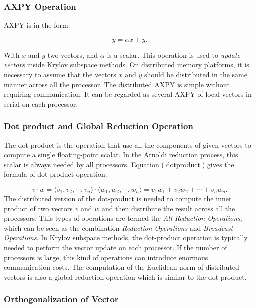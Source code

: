 {\subsubsection{AXPY Operation}

AXPY is in the form:

\begin{equation}
y = \alpha x + y.
\end{equation}

With $x$ and $y$ two vectors, and $\alpha$ is a scalar. This operation is used to \textit{update vectors} inside Krylov subspace methods. On distributed memory platforms, it is necessary to assume that the vectors $x$ and $y$ should be distributed in the same manner across all the processor. The distributed AXPY is simple without requiring communication. It can be regarded as several AXPY of local vectors in serial on each processor.

\subsubsection{Dot product and Global Reduction Operation}

The dot product is the operation that use all the components of given vectors to compute a single floating-point scalar. In the Arnoldi reduction process, this scalar is always needed by all processors. Equation (\ref{dotproduct}) gives the formula of dot product operation.

\begin{equation}
\label{dotproduct}
v\cdot w = \langle v_1, v_2, \cdots, v_n \rangle \cdot\langle w_1, w_2, \cdots, w_n\rangle = v_1w_1+v_2w_2+\cdots+v_nw_n.
\end{equation}
The distributed version of the dot-product is needed to compute the inner product of two vectors $v$ and $w$ and then distribute the result across all the processors.  This types of operations are termed the \textit{All Reduction Operations}, which can be seen as the combination \textit{Reduction Operations} and \textit{Broadcast Operations}. In Krylov subspace methods, the dot-product operation is typically needed to perform the vector update on each processor. If the number of processors is large, this kind of operations can introduce enormous communication costs. The computation of the Euclidean norm of distributed vectors is also a global reduction operation which is similar to the dot-product.

\subsubsection{Orthogonalization of Vector}

}
